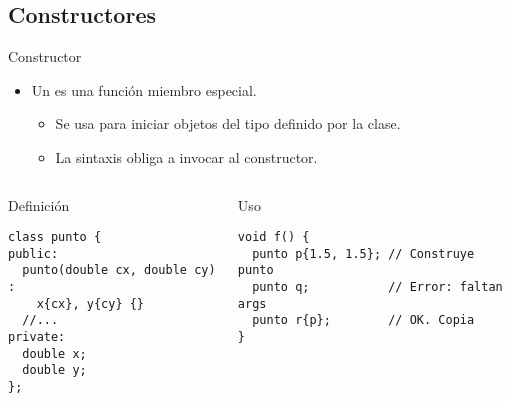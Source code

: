 \subsection{Constructores}

\begin{frame}[t,fragile]{Constructor}
\begin{itemize}
  \item Un  es una función miembro especial.
    \begin{itemize}
      \item Se usa para iniciar objetos del tipo definido por la clase.
      \item La sintaxis obliga a invocar al constructor.
    \end{itemize}
\end{itemize}
\vfill
\begin{columns}[T]

\begin{block}{Definición}
\begin{lstlisting}
class punto {
public:
  punto(double cx, double cy) : 
    x{cx}, y{cy} {}
  //...
private:
  double x;
  double y;
};
\end{lstlisting}
\end{block}

\begin{block}{Uso}
\begin{lstlisting}
void f() {
  punto p{1.5, 1.5}; // Construye punto
  punto q;           // Error: faltan args
  punto r{p};        // OK. Copia
}
\end{lstlisting}
\end{block}

\end{columns}
\end{frame}
